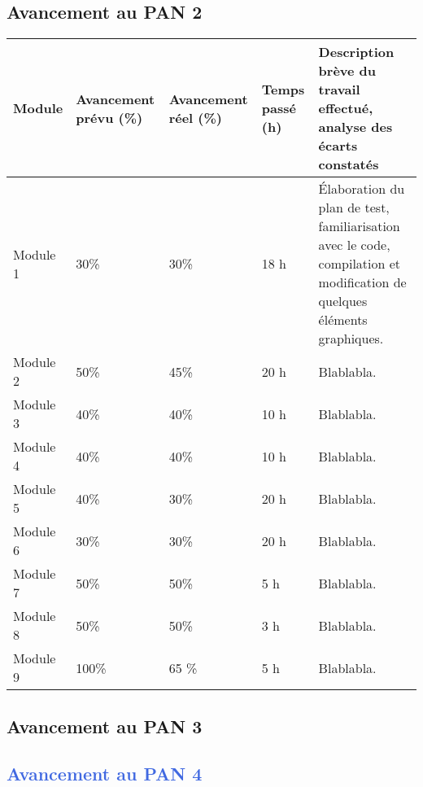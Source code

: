 \subsection{Avancement au PAN 2}
	
	\begin{tabular}{lm{1.9cm}m{1.9cm}m{1.6cm}m{5.1cm}}
		Module & Avancement prévu (\%) & Avancement réel (\%) & Temps passé (h) & Description brève du travail effectué, analyse des écarts constatés \\
		\hline \hline
		Module 1 &
			30\% & 30\% & 18 h &
			Élaboration du plan de test, familiarisation avec le code, compilation et modification de quelques éléments graphiques. \\
		\hline
		Module 2 &
			50\% & 45\% & 20 h &
			Blablabla. \\
		\hline
		Module 3 &
			40\% & 40\% & 10 h &
			Blablabla. \\
		\hline
		Module 4 &
			40\% & 40\% & 10 h &
			Blablabla. \\
		\hline
		Module 5 &
			40\% & 30\% & 20 h &
			Blablabla. \\
		\hline
		Module 6 &
			30\% & 30\% & 20 h &
			Blablabla. \\
		\hline
		Module 7 &
			50\% & 50\% & 5 h &
			Blablabla. \\
		\hline
		Module 8 &
			50\% & 50\% & 3 h &
			Blablabla. \\
		\hline
		Module 9 &
			100\% & 65 \% & 5 h &
			Blablabla.
	\end{tabular}

\subsection{Avancement au PAN 3}


\subsection{\textcolor{RoyalBlue}{Avancement au PAN 4}}

